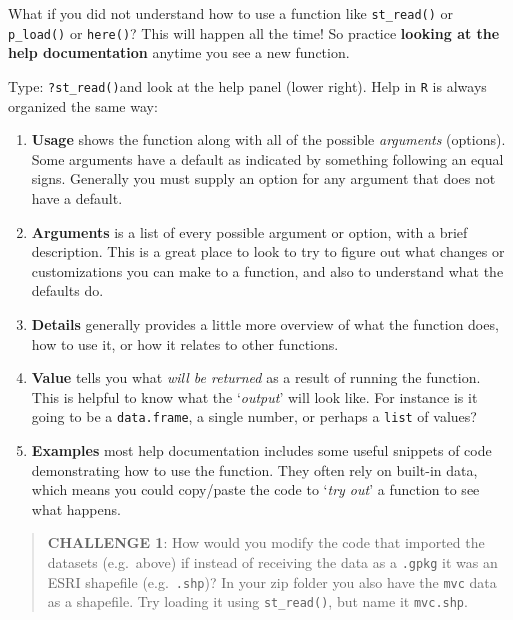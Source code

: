 \documentclass[
]{book}
\providecommand{\tightlist}{%
  \setlength{\itemsep}{0pt}\setlength{\parskip}{0pt}}
\newenvironment{rmdtip}[1]
  {
  \begin{itemize}
  \renewcommand{\labelitemi}{
    \raisebox{-.7\height}[0pt][0pt]{
      {\setkeys{Gin}{width=3em,keepaspectratio}\texttt{[image: images/\#1]}}
    }
  }
  \setlength{\fboxsep}{1em}
  \begin{tip}
  \item
  }
  {
  \end{tip}
  \end{itemize}
  }
\begin{document}
\begin{rmdtip}{note}

What if you did not understand how to use a function like \texttt{st\_read()} or \texttt{p\_load()} or \texttt{here()}? This will happen all the time! So practice \textbf{looking at the help documentation} anytime you see a new function.

Type: \texttt{?st\_read()}and look at the help panel (lower right). Help in \texttt{R} is always organized the same way:

\begin{enumerate}
\def\labelenumi{\arabic{enumi}.}
\tightlist
\item
  \textbf{Usage} shows the function along with all of the possible \emph{arguments} (options). Some arguments have a default as indicated by something following an equal signs. Generally you must supply an option for any argument that does not have a default.
\item
  \textbf{Arguments} is a list of every possible argument or option, with a brief description. This is a great place to look to try to figure out what changes or customizations you can make to a function, and also to understand what the defaults do.
\item
  \textbf{Details} generally provides a little more overview of what the function does, how to use it, or how it relates to other functions.
\item
  \textbf{Value} tells you what \emph{will be returned} as a result of running the function. This is helpful to know what the `\emph{output}' will look like. For instance is it going to be a \texttt{data.frame}, a single number, or perhaps a \texttt{list} of values?
\item
  \textbf{Examples} most help documentation includes some useful snippets of code demonstrating how to use the function. They often rely on built-in data, which means you could copy/paste the code to `\emph{try out}' a function to see what happens.
\end{enumerate}

\end{rmdtip}

\begin{quote}
\textbf{CHALLENGE 1}: How would you modify the code that imported the datasets (e.g.~above) if instead of receiving the data as a \texttt{.gpkg} it was an ESRI shapefile (e.g.~\texttt{.shp})? In your zip folder you also have the \texttt{mvc} data as a shapefile. Try loading it using \texttt{st\_read()}, but name it \texttt{mvc.shp}.
\end{quote}
\end{document}
